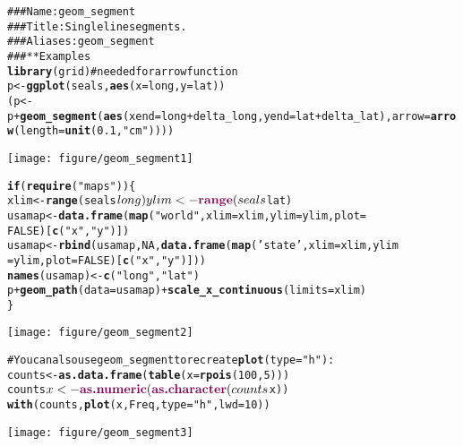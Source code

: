 \documentclass[a4paper,titlepage]{tufte-handout}\usepackage{graphicx, color}
\makeatletter
\def\maxwidth{ %
  \ifdim\Gin@nat@width>\linewidth
    \linewidth
  \else
    \Gin@nat@width
  \fi
}
\newcommand{\hlfunctioncall}[1]{\textcolor[rgb]{0.501960784313725,0,0.329411764705882}{\textbf{#1}}}%
\newcommand{\hlstring}[1]{\textcolor[rgb]{0.6,0.6,1}{#1}}%
\newcommand{\hlcomment}[1]{\textcolor[rgb]{0.180392156862745,0.6,0.341176470588235}{#1}}%
\newenvironment{kframe}{%
 \def\at@end@of@kframe{}%
 \ifinner\ifhmode%
  \def\at@end@of@kframe{\end{minipage}}%
  \begin{minipage}{\columnwidth}%
 \fi\fi%
 \def\FrameCommand##1{\hskip\@totalleftmargin \hskip-\fboxsep
 \colorbox{shadecolor}{##1}\hskip-\fboxsep
     \hskip-\linewidth \hskip-\@totalleftmargin \hskip\columnwidth}%
 \MakeFramed {\advance\hsize-\width
   \@totalleftmargin\z@ \linewidth\hsize
   \@setminipage}}%
 {\par\unskip\endMakeFramed%
 \at@end@of@kframe}
\newenvironment{knitrout}{}{} %
\makeatother
\begin{document}
\begin{knitrout}
\color{fgcolor}\begin{kframe}
\begin{alltt}
\hlcomment{### Name: geom_segment}
\hlcomment{### Title: Single line segments.}
\hlcomment{### Aliases: geom_segment}
\hlcomment{### ** Examples}
\hlfunctioncall{library}(grid) \hlcomment{# needed for arrow function}
p <- \hlfunctioncall{ggplot}(seals, \hlfunctioncall{aes}(x = long, y = lat))
(p <- p + \hlfunctioncall{geom_segment}(\hlfunctioncall{aes}(xend = long + delta_long, yend = lat + delta_lat), arrow = \hlfunctioncall{arrow}(length = \hlfunctioncall{unit}(0.1,\hlstring{"cm"}))))
\end{alltt}
\end{kframe}\texttt{[image: figure/geom\_segment1]} \begin{kframe}\begin{alltt}
\hlfunctioncall{if} (\hlfunctioncall{require}(\hlstring{"maps"})) \{
xlim <- \hlfunctioncall{range}(seals$long)
ylim <- \hlfunctioncall{range}(seals$lat)
usamap <- \hlfunctioncall{data.frame}(\hlfunctioncall{map}(\hlstring{"world"}, xlim = xlim, ylim = ylim, plot =
FALSE)[\hlfunctioncall{c}(\hlstring{"x"},\hlstring{"y"})])
usamap <- \hlfunctioncall{rbind}(usamap, NA, \hlfunctioncall{data.frame}(\hlfunctioncall{map}(\hlstring{'state'}, xlim = xlim, ylim
= ylim, plot = FALSE)[\hlfunctioncall{c}(\hlstring{"x"},\hlstring{"y"})]))
\hlfunctioncall{names}(usamap) <- \hlfunctioncall{c}(\hlstring{"long"}, \hlstring{"lat"})
p + \hlfunctioncall{geom_path}(data = usamap) + \hlfunctioncall{scale_x_continuous}(limits = xlim)
\}
\end{alltt}
\end{kframe}\texttt{[image: figure/geom\_segment2]} \begin{kframe}\begin{alltt}
# You can also use geom_segment to recreate \hlfunctioncall{plot}(type = \hlstring{"h"}) :
counts <- \hlfunctioncall{as.data.frame}(\hlfunctioncall{table}(x = \hlfunctioncall{rpois}(100,5)))
counts$x <- \hlfunctioncall{as.numeric}(\hlfunctioncall{as.character}(counts$x))
\hlfunctioncall{with}(counts, \hlfunctioncall{plot}(x, Freq, type = \hlstring{"h"}, lwd = 10))
\end{alltt}
\end{kframe}\texttt{[image: figure/geom\_segment3]} \begin{kframe}\begin{alltt}

\end{alltt}
\end{kframe}
\end{knitrout}
\end{document}
